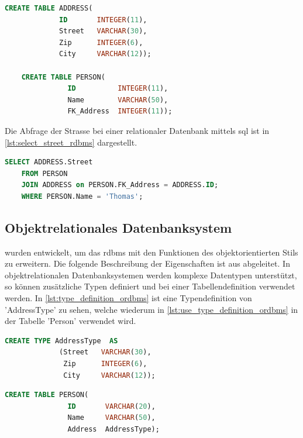 \begin{lstlisting}[language=SQL, caption=Tabellendefinition in relationalem Datenbanksystem, label=lst:table_definition_rdbms]  
    CREATE TABLE ADDRESS(
             ID       INTEGER(11),
             Street   VARCHAR(30),
             Zip      INTEGER(6),
             City     VARCHAR(12));

    CREATE TABLE PERSON(
               ID          INTEGER(11),
               Name        VARCHAR(50),
               FK_Address  INTEGER(11));
\end{lstlisting}

Die Abfrage der Strasse bei einer relationaler Datenbank mittels \gls{sql} ist in \autoref{lst:select_street_rdbms} dargestellt.

\begin{lstlisting}[language=SQL, caption=Abfrage in relationalem Datenbanksystem, label=lst:select_street_rdbms]  
    SELECT ADDRESS.Street
    FROM PERSON 
    JOIN ADDRESS on PERSON.FK_Address = ADDRESS.ID;
    WHERE PERSON.Name = 'Thomas';
\end{lstlisting}

\subsection{Objektrelationales Datenbanksystem}\label{ordbms}
 wurden entwickelt, um das \gls{rdbms} mit den Funktionen des objektorientierten Stils zu erweitern.
Die folgende Beschreibung der Eigenschaften ist aus \cite{limited2010introduction} abgeleitet. In objektrelationalen Datenbanksystemen werden 
komplexe Datentypen unterstützt, so können zusätzliche Typen definiert und bei einer Tabellendefinition verwendet werden.  
In \autoref{lst:type_definition_ordbms} ist eine Typendefinition von 'AddressType' zu sehen, welche wiederum in \autoref{lst:use_type_definition_ordbms} 
in der Tabelle 'Person' verwendet wird.

\begin{lstlisting}[language=SQL, caption=Typendefinition im objektrelationalen Datenbanksystem, label=lst:type_definition_ordbms]  
    CREATE TYPE AddressType  AS
             (Street   VARCHAR(30),
              Zip      INTEGER(6),
              City     VARCHAR(12));
\end{lstlisting}

\begin{lstlisting}[language=SQL, caption=Verwendung von Typendefinition im objektrelationalen Datenbanksystem, label=lst:use_type_definition_ordbms]  
    CREATE TABLE PERSON(
               ID       VARCHAR(20),
               Name     VARCHAR(50),
               Address  AddressType);
\end{lstlisting}

